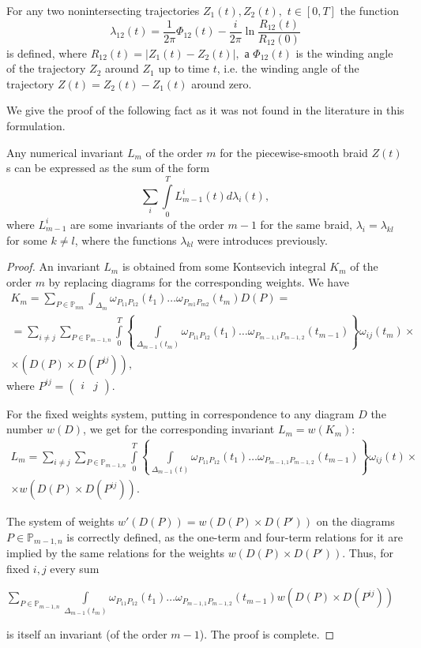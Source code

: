 \documentclass[12pt, a4paper, titlepage]{article}
\begin{document}
 For any two nonintersecting trajectories $Z_1(t), Z_2(t),$ $t\in [0,T]$ the function
$$\lambda_{12}(t)=\frac{1}{2\pi}\Phi_{12}(t)-\frac{i}{2\pi}\ln\frac{R_{12}(t)}{R_{12}(0)}$$
is defined, 
where
$R_{12}(t)=|Z_1(t)-Z_2(t)|,$ а $\Phi_{12}(t)$ is the winding angle 
of the trajectory $Z_2$ around $Z_1$ up to time $t$, 
i.e. the winding angle of the trajectory $Z(t)=Z_2(t)-Z_1(t)$ around zero.

We give the proof of the following fact as it was not found in the literature
in this formulation. 
\begin{statement}\label{IterativeRepresentationStatement}
Any numerical invariant $L_m$ of the order $m$ for the piecewise-smooth braid $Z(t)$s 
can be expressed as the sum of the form 
$$\sum\limits_i \int\limits_{0}^T L^i_{m-1}(t)d\lambda_i(t),$$
where $L^i_{m-1}$ are some invariants of the order $m-1$ for the same braid, 
$\lambda_i=\lambda_{kl}$ for some $k\ne l$, 
where the functions $\lambda_{kl}$ were introduces previously. 
\end{statement}

\begin{proof}
An invariant $L_m$ is obtained from some Kontsevich integral $K_m$ of the order $m$
by replacing diagrams for the corresponding weights. 
 We have
 \begin{multline*}
K_m=\sum\limits_{P\in \mathbb{P}_{mn}}
\int_{\Delta_m}\omega_{P_{11}P_{12}}(t_1)\dots\omega_{P_{m1}P_{m2}}(t_m)D(P)=\\=
\sum\limits_{i \ne j}\sum\limits_{P\in \mathbb{P}_{m-1,n}}
\int\limits_{0}^{T}\left\{\int\limits_{\Delta_{m-1}(t_m)}\omega_{P_{11}P_{12}}(t_1)\dots
\omega_{P_{m-1,1}P_{m-1,2}}(t_{m-1})\right\} \omega_{ij}(t_m)\times \\ \times 
(D(P)\times D(P^{ij})),
 \end{multline*}
where $P^{ij}=
\begin{pmatrix}
 i & j
\end{pmatrix}
.$

For the fixed weights system, putting in correspondence to any diagram $D$ the number $w(D)$, 
we get for the corresponding invariant $L_m=w(K_m)$:
\begin{multline*}
 L_m=
 \sum\limits_{i \ne j}\sum\limits_{P\in \mathbb{P}_{m-1,n}}
\int\limits_{0}^{T}\left\{\int\limits_{\Delta_{m-1}(t)}\omega_{P_{11}P_{12}}(t_1)\dots
\omega_{P_{m-1,1}P_{m-1,2}}(t_{m-1})\right\} \omega_{ij}(t)  \times \\ \times
w(D(P)\times D(P^{i j})).
\end{multline*}

 The system of weights $w'(D(P))=w(D(P)\times D(P'))$ on the diagrams $P\in \mathbb{P}_{m-1,n}$ 
is correctly defined, as the one-term and four-term relations for it are implied
by the same relations for the weights $w(D(P)\times D(P')).$ 
Thus, for fixed $i, j$ every sum 
\begin{center}
$\sum\limits_{P\in \mathbb{P}_{m-1,n}}\int\limits_{\Delta_{m-1}(t_m)}\omega_{P_{11}P_{12}}(t_1)\dots
\omega_{P_{m-1,1}P_{m-1,2}}(t_{m-1}) w(D(P)\times D(P^{ij}))$
\end{center}
is itself an invariant (of the order $m-1$). The proof is complete. 
\end{proof}
\end{document}
